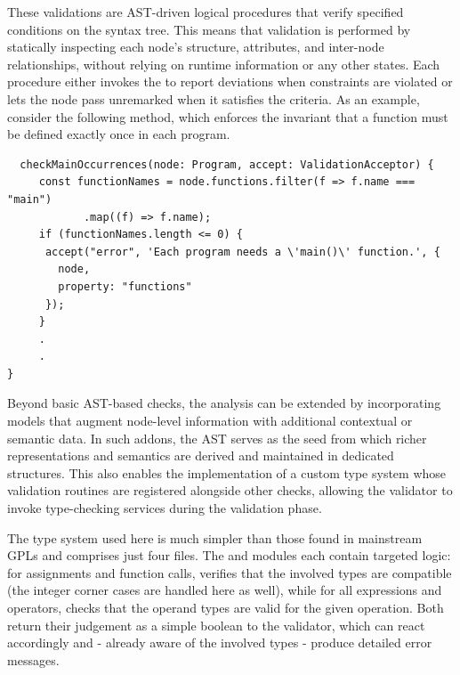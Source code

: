 These validations are AST-driven logical procedures that verify specified conditions on the syntax tree. This means that validation is performed by statically inspecting
each node's structure, attributes, and inter-node relationships, without relying on runtime information or any other states.
Each procedure either invokes the  to report deviations when constraints are violated or lets the node pass unremarked when it
satisfies the criteria. As an example, consider the following  method, which enforces the invariant that a  function must be defined exactly once in each program.
\begin{verbatim}
  checkMainOccurrences(node: Program, accept: ValidationAcceptor) {
     const functionNames = node.functions.filter(f => f.name === "main")
            .map((f) => f.name);
     if (functionNames.length <= 0) {
      accept("error", 'Each program needs a \'main()\' function.', {
        node,
        property: "functions"
      });
     }
     .
     .
}
\end{verbatim}
\vspace{0.5em}

Beyond basic AST-based checks, the analysis can be extended by incorporating models that augment node-level information with additional contextual or semantic data.
In such addons, the AST serves as the seed from which richer representations and semantics are derived and maintained in dedicated structures.
This also enables the implementation of a custom type system whose validation routines are registered alongside other checks, allowing the validator to
invoke type-checking services during the validation phase.

The type system used here is much simpler than those found in mainstream GPLs and comprises just four files. The  and 
modules each contain targeted logic: for assignments and function calls,  verifies that the involved types are compatible (the integer corner cases are handled here as well),
while for all expressions and operators,  checks that the operand types are valid for the given operation. Both return their judgement as a simple boolean to
the validator, which can react accordingly and - already aware of the involved types - produce detailed error messages.

